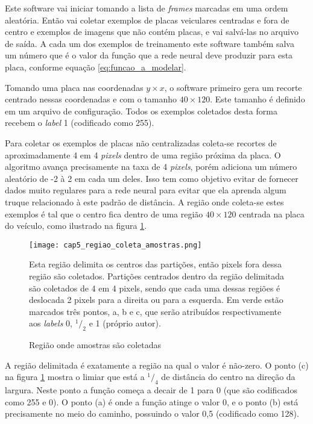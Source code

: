 Este software vai iniciar tomando a lista de \emph{frames} marcadas em
uma ordem
aleatória. Então vai coletar exemplos de placas veiculares centradas e fora
de centro e exemplos de imagens que não contém placas, e vai salvá-las no
arquivo de saída. A cada um dos exemplos de treinamento este software
também salva um número que é o valor da função que a rede neural deve
produzir para esta placa, conforme equação \ref{eq:funcao_a_modelar}.

Tomando uma placa nas coordenadas $y \times x$, o software primeiro gera um
recorte centrado nessas coordenadas e com o tamanho $40 \times 120$. Este
tamanho é definido em um arquivo de configuração. Todos os exemplos
coletados desta forma recebem o \emph{label} 1 (codificado como 255).

Para coletar os exemplos de placas não centralizadas coleta-se recortes de
aproximadamente 4 em 4 \emph{pixels} dentro de uma região próxima da placa. O
algoritmo avança precisamente na taxa de 4 \emph{pixels}, porém adiciona um
número aleatório de -2 à 2 em cada um deles. Isso tem como objetivo evitar de
fornecer dados muito regulares para a rede neural para evitar que ela
aprenda algum truque relacionado à este padrão de distância. A região onde
coleta-se estes exemplos é tal que o centro fica dentro de uma região
$40 \times 120$ centrada na placa do veículo, como ilustrado na figura
\ref{fig:cap5_regiao_coleta_amostras}.

\begin{figure}[!htb]
	\centering
	\texttt{[image: cap5\_regiao\_coleta\_amostras.png]}
	\caption{Região onde amostras são coletadas}
	\label{fig:cap5_regiao_coleta_amostras}
	Esta região delimita os centros das partições, então pixels fora dessa
	região são coletados. Partições centrados dentro da região delimitada são
	coletados de 4 em 4 pixels, sendo que cada uma dessas regiões é deslocada 2
	pixels para a direita ou para a esquerda. Em verde estão marcados três
	pontos, a, b e c, que serão atribuídos respectivamente aos \emph{labels} 0,
	$^1/_2$ e 1 (próprio autor).
\end{figure}

A região delimitada é exatamente a região na qual o valor é não-zero. O ponto
(c) na figura \ref{fig:cap5_regiao_coleta_amostras} mostra o limiar que está
a $^1/_4$ de distância do centro na direção da largura. Neste ponto a função
começa a decair de 1 para 0 (que são codificados como 255 e 0). O ponto (a)
é onde a função atinge o valor 0, e o ponto (b) está precisamente no
meio do caminho, possuindo o valor 0,5 (codificado como 128).

